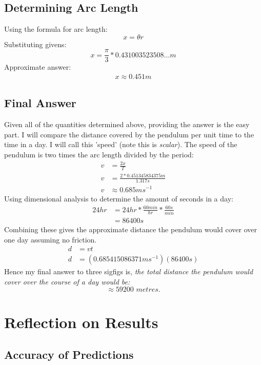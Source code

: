 \documentclass[11pt,a4paper]{article}
\begin{document}
\subsection{Determining Arc Length}

Using the formula for arc length:
\[x = \theta r\]
Substituting givens:
\[x = \frac{\pi}{3} * 0.431003523508... m\]
Approximate answer:
\begin{align}
x \approx 0.451 m
\end{align}

\subsection{Final Answer}
Given all of the quantities determined above,  providing the answer is the easy part.  I will compare the distance covered by the pendulum per unit time to the time in a day.  I will call this 'speed' (note this is \textit{scalar}).  The speed of the pendulum is two times the arc length divided by the period:
\begin{align}
v &= \frac{2x}{T}\\
v &= \frac{2*0.451345834375 m}{1.317 s}\\
v&\approx 0.685 ms^{-1}
\end{align}
Using dimensional analysis to determine the amount of seconds in a day:
\begin{align}
24hr &= 24 hr*\frac{60min}{hr}*\frac{60s}{min} \\
&= 86400 s
\end{align}
Combining these gives the approximate distance the pendulum would cover over one day assuming no friction.
\begin{align}
d &= vt\\
d &= (0.685415086371 ms^{-1})(86400s)
\end{align}
Hence my final answer to three sigfigs is, \textit{the total distance the pendulum would cover over the course of a day would be: }
\begin{equation}
 \approx 59200 \textit{ metres.}
\end{equation}

\section{Reflection on Results}

\subsection{Accuracy of Predictions}
\end{document}
